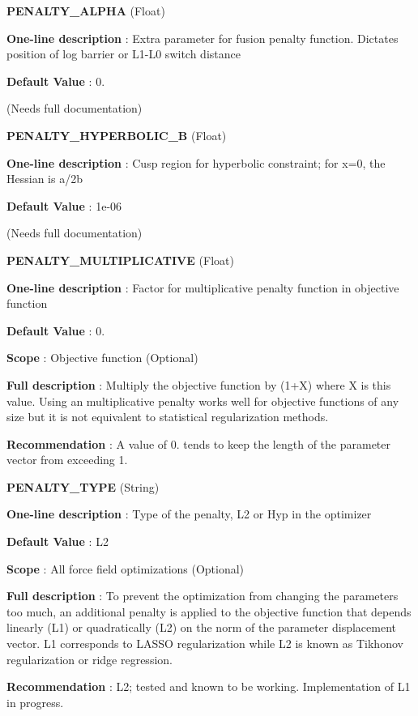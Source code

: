 \begin{DoxyItemize}
\item {\bfseries  P\-E\-N\-A\-L\-T\-Y\-\_\-\-A\-L\-P\-H\-A } (Float) \par
{\bfseries  One-\/line description }\-: Extra parameter for fusion penalty function. Dictates position of log barrier or L1-\/\-L0 switch distance \par
{\bfseries  Default Value }\-: 0. \par
(Needs full documentation)\end{DoxyItemize}
\begin{DoxyItemize}
\item {\bfseries  P\-E\-N\-A\-L\-T\-Y\-\_\-\-H\-Y\-P\-E\-R\-B\-O\-L\-I\-C\-\_\-\-B } (Float) \par
{\bfseries  One-\/line description }\-: Cusp region for hyperbolic constraint; for x=0, the Hessian is a/2b \par
{\bfseries  Default Value }\-: 1e-\/06 \par
(Needs full documentation)\end{DoxyItemize}
\begin{DoxyItemize}
\item {\bfseries  P\-E\-N\-A\-L\-T\-Y\-\_\-\-M\-U\-L\-T\-I\-P\-L\-I\-C\-A\-T\-I\-V\-E } (Float) \par
{\bfseries  One-\/line description }\-: Factor for multiplicative penalty function in objective function \par
{\bfseries  Default Value }\-: 0. \par
{\bfseries  Scope }\-: Objective function (Optional) \par
{\bfseries  Full description }\-: Multiply the objective function by (1+\-X) where X is this value. Using an multiplicative penalty works well for objective functions of any size but it is not equivalent to statistical regularization methods. \par
{\bfseries  Recommendation }\-: A value of 0. tends to keep the length of the parameter vector from exceeding 1.\end{DoxyItemize}
\begin{DoxyItemize}
\item {\bfseries  P\-E\-N\-A\-L\-T\-Y\-\_\-\-T\-Y\-P\-E } (String) \par
{\bfseries  One-\/line description }\-: Type of the penalty, L2 or Hyp in the optimizer \par
{\bfseries  Default Value }\-: L2 \par
{\bfseries  Scope }\-: All force field optimizations (Optional) \par
{\bfseries  Full description }\-: To prevent the optimization from changing the parameters too much, an additional penalty is applied to the objective function that depends linearly (L1) or quadratically (L2) on the norm of the parameter displacement vector. L1 corresponds to L\-A\-S\-S\-O regularization while L2 is known as Tikhonov regularization or ridge regression. \par
{\bfseries  Recommendation }\-: L2; tested and known to be working. Implementation of L1 in progress.\end{DoxyItemize}
